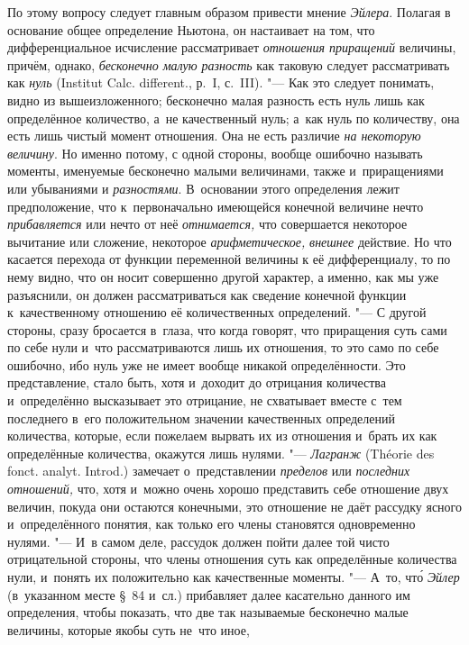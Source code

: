 По этому вопросу следует главным образом привести мнение {\em Эйлера}. Полагая
в основание общее определение Ньютона, он настаивает на том, что
дифференциальное исчисление рассматривает {\em отношения приращений}
величины, причём, однако, {\em бесконечно малую разность} как таковую следует
рассматривать как {\em нуль} (Ins\-ti\-tut Calc.
dif\-fe\-rent., р.~I, с.~III). "--- Как это следует понимать, видно из
вышеизложенного; бесконечно малая разность есть нуль лишь как определённое количество, а~не
качественный нуль; а~как нуль по количеству, она есть лишь чистый момент
отношения. Она не есть различие {\em на некоторую величину}. Но именно потому,
с одной стороны, вообще ошибочно называть моменты, именуемые бесконечно малыми
величинами, также и~приращениями или убываниями и {\em разностями}. В~основании
этого определения лежит предположение, что к~первоначально имеющейся конечной
величине нечто {\em прибавляется} или нечто от неё {\em отнимается,} что
совершается некоторое вычитание или сложение, некоторое {\em арифметическое,}
{\em внешнее} действие. Но что касается перехода от функции переменной величины
к её дифференциалу, то по нему видно, что он носит совершенно другой характер,
а именно, как мы уже разъяснили, он должен рассматриваться как сведение
конечной функции к~качественному отношению её количественных определений. "---
С другой стороны, сразу бросается в~глаза, что когда говорят, что приращения
суть сами по себе нули и~что рассматриваются лишь их отношения, то это само по
себе ошибочно, ибо нуль уже не имеет вообще никакой определённости. Это
представление, стало быть, хотя и~доходит до отрицания количества и~определённо
высказывает это отрицание, не схватывает вместе с~тем последнего в~его
положительном значении качественных определений количества, которые, если
пожелаем вырвать их из отношения и~брать их как определённые количества,
окажутся лишь нулями. "--- {\em Лагранж} (Théorie des fonct. analyt. Introd.)
замечает о~представлении {\em пределов} или {\em последних отношений,} что,
хотя и~можно очень хорошо представить себе отношение двух величин, покуда они
остаются конечными, это отношение не даёт рассудку ясного и~определённого
понятия, как только его члены становятся одновременно нулями. "--- И~в самом
деле, рассудок должен пойти далее той чисто отрицательной стороны, что члены
отношения суть как определённые количества нули, и~понять их положительно как
качественные моменты. "--- А~то, чт\'{о} {\em Эйлер} (в~указанном месте \S~84
и~сл.) прибавляет далее касательно данного им определения, чтобы показать, что
две так называемые бесконечно малые величины, которые якобы суть не~что иное,
